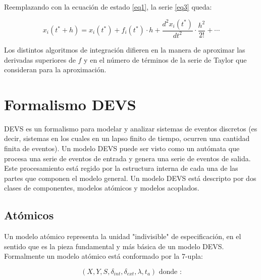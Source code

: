 \documentclass[a4paper,	11pt]{report}
\begin{document}
Reemplazando con la ecuación de estado \eqref{eq1}, la serie \eqref{eq3} queda:

\begin{equation} \label{eq4}
x_i(t^* + h) = x_i(t^*) + f_i(t^*) \cdot h + \frac{d^{2}x_i (t^*)}{dt^2} \cdot \frac{h^2}{2!} + \cdots
\end{equation}

Los distintos algoritmos de integración difieren en la manera de aproximar las derivadas superiores de $f$ y en el número de términos de la serie de Taylor que consideran para la aproximación.

\section{Formalismo DEVS}

DEVS es un formalismo para modelar y analizar sistemas de eventos discretos (es decir, sistemas en los cuales en un lapso finito de tiempo, ocurren una cantidad finita de eventos).
Un modelo DEVS puede ser visto como un autómata que procesa una serie de eventos de entrada y genera una serie de eventos de salida. Este procesamiento está regido por la estructura interna de cada una de las partes que componen el modelo general.
Un modelo DEVS está descripto por dos clases de componentes, modelos atómicos y modelos acoplados.

\subsection{Atómicos}

Un modelo atómico representa la unidad "indivisible" de especificación, en el sentido que es la pieza fundamental y más básica de un modelo DEVS. Formalmente un modelo atómico está conformado por la 7-upla:

\begin{equation} 
(X, Y, S, \delta_{int} , \delta_{ext}, \lambda, t_{a}) \mbox{ donde :}
\end{equation}
\end{document}
